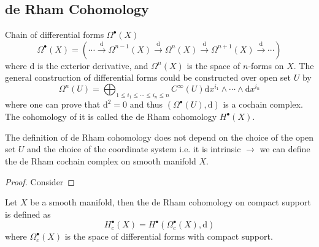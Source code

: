 \documentclass[10pt]{article}
\begin{document}
\subsection{de Rham Cohomology}

Chain of differential forms $ \Omega^{\bullet}(X)$
\begin{equation}\label{eq:deRhamChain}
  \Omega^{\bullet}(X) = \left( \cdots \xrightarrow{\mathrm{d}} \Omega^{n-1}(X) \xrightarrow{\mathrm{d}} \Omega^{n}(X) \xrightarrow{\mathrm{d}} \Omega^{n+1}(X) \xrightarrow{\mathrm{d}} \cdots \right)
\end{equation}
where $ \mathrm{d} $ is the exterior derivative, and $ \Omega^{n}(X)$ is the space of $ n$-forms on $ X$. The general construction of differential forms could be constructed over open set $ U$ by
\begin{equation*}
  \Omega^{n}(U) = \bigoplus_{1 \le i_1 \le \cdots \le i_n \le n} C^{\infty }(U) \mathrm{d} x^{i_1} \wedge \cdots \wedge \mathrm{d} x^{i_n}
\end{equation*}
where one can prove that $ \mathrm{d} ^{2} = 0$ and thus $\left( \Omega^{\bullet}(U), \mathrm{d} \right)$  is a cochain complex. The cohomology of it is called the de Rham cohomology $ H^{\bullet}(X)$.
\begin{proposition}
  The definition of de Rham cohomology does not depend on the choice of the open set $U$ and the choice of the coordinate system i.e. it is intrinsic $\longrightarrow$ we can define the de Rham cochain complex on smooth manifold $ X$.
\end{proposition}
\begin{proof}
  Consider
\end{proof}

\begin{definition}
  Let $ X$ be a smooth manifold, then the de Rham cohomology on compact support is defined as
  \begin{equation}
    H^{\bullet}_{c}(X) = H^{\bullet}(\Omega^{\bullet}_{c}(X),\mathrm{d})
  \end{equation}
  where $ \Omega^{\bullet}_{c}(X)$ is the space of differential forms with compact support.
\end{definition}
\end{document}

